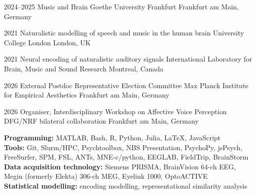 \documentclass[a4paper,11pt]{article}
\begin{document}
\cventry
  {2024--2025}
  {Music and Brain}
  {Goethe University Frankfurt}
  {Frankfurt am Main, Germany}


\cventry
  {2021}
  {Naturalistic modelling of speech and music in the human brain}
  {University College London}
  {London, UK}

\cventry
  {2021}
  {Neural encoding of naturalistic auditory signals}
  {International Laboratory for Brain, Music and Sound Research}
  {Montreal, Canada}


\cventry
  {2026}
  {External Postdoc Representative Election Committee}
  {Max Planck Institute for Empirical Aesthetics}
  {Frankfurt am Main, Germany}

\cventry
  {2026}
  {Organiser, Interdisciplinary Workshop on Affective Voice Perception}
  {DFG/NRF bilateral collaboration}
  {Frankfurt am Main, Germany}


\noindent
\textbf{Programming:} MATLAB, Bash, R, Python, Julia, \LaTeX, JavaScript\\
\textbf{Tools:} Git, Slurm/HPC, Psychtoolbox, NBS Presentation, PsychoPy, jsPsych, FreeSurfer, SPM, FSL, ANTs, MNE-c/python, EEGLAB, FieldTrip, BrainStorm \\
\textbf{Data acquisition technology:} Siemens PRISMA, BrainVision 64-ch EEG, Megin (formerly Elekta) 306-ch MEG, Eyelink 1000, OptoACTIVE\\
\textbf{Statistical modelling:} encoding modelling, representational similarity analysis\\
\end{document}
